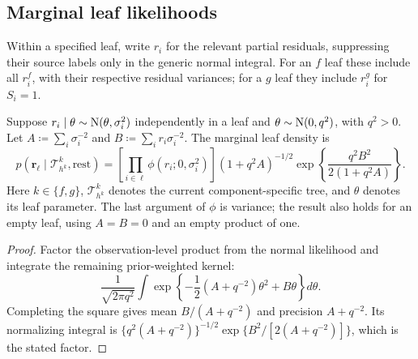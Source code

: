\subsection{Marginal leaf likelihoods}\label{sec:A.3}
Within a specified leaf, write $r_i$ for the relevant partial residuals, suppressing their source labels only in the generic normal integral. For an $f$ leaf these include all $r_i^f$, with their respective residual variances; for a $g$ leaf they include $r_i^g$ for $S_i=1$.
\begin{lemma}\label{lem:leaf}
Suppose $r_i\mid\theta\sim\mathrm{N}(\theta,\sigma_i^2)$ independently in a leaf and $\theta\sim\mathrm{N}(0,q^2)$, with $q^2>0$. Let $A\coloneqq \sum_i\sigma_i^{-2}$ and $B\coloneqq \sum_i r_i\sigma_i^{-2}$. The marginal leaf density is
\begin{equation}\label{eq:leafdensity}
p(\mathbf r_\ell\mid \mathcal T_{h^k}^k,\text{rest})=
\left[\prod_{i\in\ell}\phi(r_i;0,\sigma_i^2)\right]
(1+q^2A)^{-1/2}\exp\!\left\{\frac{q^2B^2}{2(1+q^2A)}\right\}.
\end{equation}
Here $k\in\{f,g\}$, $\mathcal T_{h^k}^k$ denotes the current component-specific tree, and $\theta$ denotes its leaf parameter. The last argument of $\phi$ is variance; the result also holds for an empty leaf, using $A=B=0$ and an empty product of one.
\end{lemma}
\begin{proof}
Factor the observation-level product from the normal likelihood and integrate the remaining prior-weighted kernel:
\begin{equation}
\frac{1}{\sqrt{2\pi q^2}}\int\exp\left\{-\frac12(A+q^{-2})\theta^2+B\theta\right\}d\theta.
\end{equation}
Completing the square gives mean $B/(A+q^{-2})$ and precision $A+q^{-2}$. Its normalizing integral is $\{q^2(A+q^{-2})\}^{-1/2}\exp\{B^2/[2(A+q^{-2})]\}$, which is the stated factor.
\end{proof}

